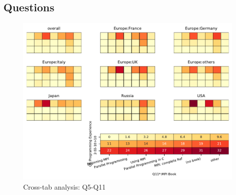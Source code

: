 
\subsection{Questions}


\begin{figure}
\begin{center}
\includegraphics[width=12cm]{../pdfs/Q5-Q11.pdf}
\caption{Cross-tab analysis: Q5-Q11}
\label{fig:Q5-Q11}
\end{center}
\end{figure}
